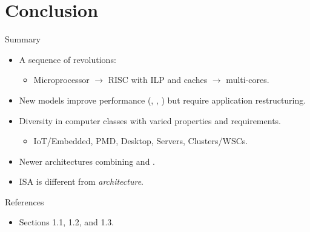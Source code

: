 \section{Conclusion}

\begin{frame}[t]{Summary}
\begin{itemize}
  \item A sequence of revolutions:
    \begin{itemize}
      \item Microprocessor $\rightarrow$ RISC with ILP and caches $\rightarrow$ multi-cores.
    \end{itemize}

  \item New models improve performance (, , ) but
        require application restructuring.

  \item Diversity in computer classes with varied properties and requirements.
    \begin{itemize}
      \item IoT/Embedded, PMD, Desktop, Servers, Clusters/WSCs.
    \end{itemize}

  \item Newer architectures combining  and .

  \item ISA is different from \emph{architecture}.

\end{itemize}
\end{frame}

\begin{frame}[t]{References}
\begin{itemize}
  \item \bibhennessy
  Sections 1.1, 1.2, and 1.3.

\end{itemize}
\end{frame}
